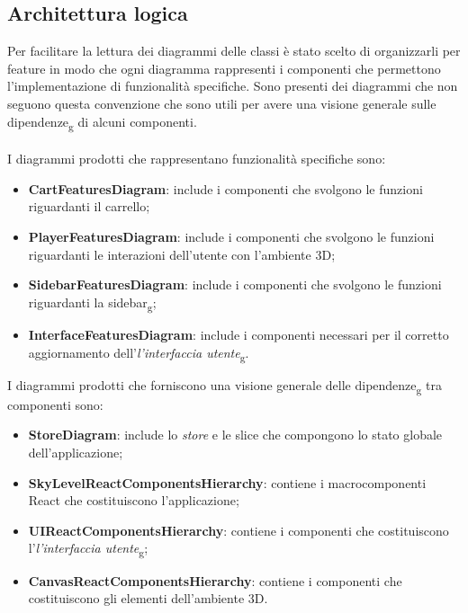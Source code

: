 \subsection{Architettura logica}
Per facilitare la lettura dei diagrammi delle classi è stato scelto di organizzarli per feature in modo che ogni diagramma 
rappresenti i componenti che permettono l'implementazione di funzionalità specifiche.
Sono presenti dei diagrammi che non seguono questa convenzione che sono utili per avere una visione generale sulle dipendenze\textsubscript{g}
di alcuni componenti.
\\\\
I diagrammi prodotti che rappresentano funzionalità specifiche sono:
\begin{itemize}
	\item \textbf{CartFeaturesDiagram}: include i componenti che svolgono le funzioni riguardanti il carrello;
	\item \textbf{PlayerFeaturesDiagram}: include i componenti che svolgono le funzioni riguardanti le interazioni dell'utente con 
	l'ambiente 3D;
	\item \textbf{SidebarFeaturesDiagram}: include i componenti che svolgono le funzioni riguardanti la sidebar\textsubscript{g};
	\item \textbf{InterfaceFeaturesDiagram}: include i componenti necessari per il corretto aggiornamento dell'\textit{l'interfaccia 
		utente}\textsubscript{g}.
\end{itemize}
I diagrammi prodotti che forniscono una visione generale delle dipendenze\textsubscript{g} tra componenti sono:
\begin{itemize}
	\item \textbf{StoreDiagram}: include lo \textit{store} e le slice che compongono lo stato globale dell'applicazione;
	\item \textbf{SkyLevelReactComponentsHierarchy}: contiene i macrocomponenti React che costituiscono l'applicazione;
	\item \textbf{UIReactComponentsHierarchy}: contiene i componenti che costituiscono l'\textit{l'interfaccia 
		utente}\textsubscript{g};
	\item \textbf{CanvasReactComponentsHierarchy}: contiene i componenti che costituiscono gli elementi dell'ambiente 3D.
\end{itemize}
